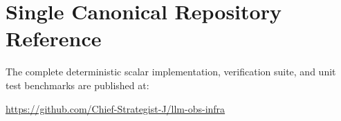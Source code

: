 \documentclass[11pt,a4paper]{article}
\theoremstyle{definition}
\begin{document}
\section{Single Canonical Repository Reference}

The complete deterministic scalar implementation, verification suite, and unit test benchmarks are published at:
\begin{center}
\url{https://github.com/Chief-Strategist-J/llm-obs-infra}
\end{center}
\end{document}
